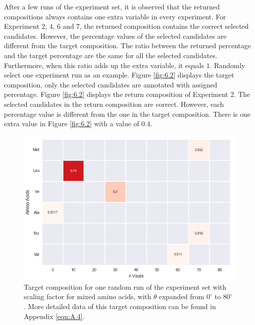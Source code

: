 After a few runs of the experiment set, it is observed that the returned compositions always contains one extra variable in every experiment. For Experiment 2, 4, 6 and 7, the returned composition contains the correct selected candidates. However, the percentage values of the selected candidates are different from the target composition. The ratio between the returned percentage and the target percentage are the same for all the selected candidates. Furthermore, when this ratio adds up the extra variable, it equals $1$. Randomly select one experiment run as an example. Figure \ref{fig:6.2} displays the target composition, only the selected candidates are annotated with assigned percentage. Figure \ref{fig:6.2} displays the return composition of Experiment 2. The selected candidates in the return composition are correct. However, each percentage value is different from the one in the target composition. There is one extra value in Figure \ref{fig:6.2} with a value of $0.4$. \\

\begin{figure}[!ht] 
\centering
\includegraphics[scale=0.9]{Figures/chapter6_figure_one.png}
\caption{Target composition for one random run of the experiment set with scaling factor for mixed amino acids, with $\theta$ expanded from $0^{\circ}$ to $80^{\circ}$. More detailed data of this target composition can be found in Appendix \ref{eqn:A.4}.} \label{fig:6.1}
\end{figure}

